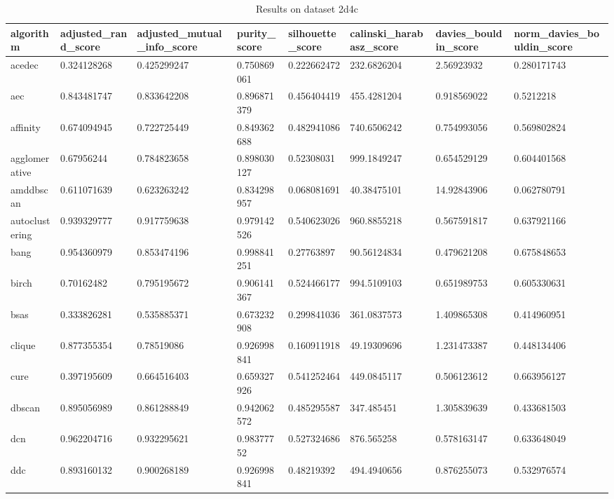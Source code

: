 \clearpage

\begin{table}[H]
\centering
\caption{Results on dataset 2d4c}
\label{S52_Table}
\begin{tabular}{|l|l|l|l|l|l|l|l|}
\hline
algorithm & adjusted\_rand\_score & adjusted\_mutual\_info\_score & purity\_score & silhouette\_score & calinski\_harabasz\_score & davies\_bouldin\_score & norm\_davies\_bouldin\_score \\
\hline
acedec & 0.324128268 & 0.425299247 & 0.750869061 & 0.222662472 & 232.6826204 & 2.56923932 & 0.280171743 \\
\hline
aec & 0.843481747 & 0.833642208 & 0.896871379 & 0.456404419 & 455.4281204 & 0.918569022 & 0.5212218 \\
\hline
affinity & 0.674094945 & 0.722725449 & 0.849362688 & 0.482941086 & 740.6506242 & 0.754993056 & 0.569802824 \\
\hline
agglomerative & 0.67956244 & 0.784823658 & 0.898030127 & 0.52308031 & 999.1849247 & 0.654529129 & 0.604401568 \\
\hline
amddbscan & 0.611071639 & 0.623263242 & 0.834298957 & 0.068081691 & 40.38475101 & 14.92843906 & 0.062780791 \\
\hline
autoclustering & 0.939329777 & 0.917759638 & 0.979142526 & 0.540623026 & 960.8855218 & 0.567591817 & 0.637921166 \\
\hline
bang & 0.954360979 & 0.853474196 & 0.998841251 & 0.27763897 & 90.56124834 & 0.479621208 & 0.675848653 \\
\hline
birch & 0.70162482 & 0.795195672 & 0.906141367 & 0.524466177 & 994.5109103 & 0.651989753 & 0.605330631 \\
\hline
bsas & 0.333826281 & 0.535885371 & 0.673232908 & 0.299841036 & 361.0837573 & 1.409865308 & 0.414960951 \\
\hline
clique & 0.877355354 & 0.78519086 & 0.926998841 & 0.160911918 & 49.19309696 & 1.231473387 & 0.448134406 \\
\hline
cure & 0.397195609 & 0.664516403 & 0.659327926 & 0.541252464 & 449.0845117 & 0.506123612 & 0.663956127 \\
\hline
dbscan & 0.895056989 & 0.861288849 & 0.942062572 & 0.485295587 & 347.485451 & 1.305839639 & 0.433681503 \\
\hline
dcn & 0.962204716 & 0.932295621 & 0.98377752 & 0.527324686 & 876.565258 & 0.578163147 & 0.633648049 \\
\hline
ddc & 0.893160132 & 0.900268189 & 0.926998841 & 0.48219392 & 494.4940656 & 0.876255073 & 0.532976574 \\

\end{tabular}
\end{table}
